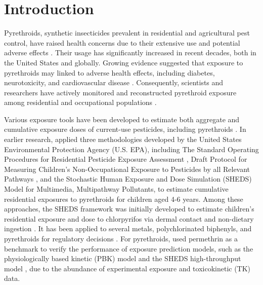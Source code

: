 \documentclass[toxics,article,submit,pdftex,moreauthors]{Definitions/mdpi}
\begin{document}
\section{Introduction}\label{introduction}

Pyrethroids, synthetic insecticides prevalent in residential and agricultural
pest control, have raised health concerns due to their extensive use and
potential adverse effects \citep{burns2018pyrethroid}. Their usage has
significantly increased in recent decades, both in the United States and
globally. Growing evidence suggested that exposure to pyrethroids may linked to
adverse health effects, including diabetes, neurotoxicity, and cardiovascular
disease \citep{park2019environmental, bao2020association,
kim2021environmental}. Consequently, scientists and researchers have actively
monitored and reconstructed pyrethroid exposure among residential and
occupational populations \citep{zartarian2012quantifying,
bravo2022occupational}.

Various exposure tools have been developed to estimate both aggregate
and cumulative exposure doses of current-use pesticides, including
pyrethroids
\citep{tulve2011methodologies, zartarian2012quantifying, xue2014epa}. In
earlier research, \citet{tulve2011methodologies} applied three methodologies
developed by the United States Environmental Protection Agency (U.S. EPA),
including The Standard Operating Procedures for Residential Pesticide Exposure
Assessment \citep{us2012standard}, Draft Protocol for Measuring Children's
Non-Occupational Exposure to Pesticides by all Relevant Pathways
\citep{us2001draft}, and the Stochastic Human Exposure and Dose Simulation
(SHEDS) Model for Multimedia, Multipathway Pollutants, to estimate cumulative
residential exposures to pyrethroids for children aged 4-6 years. Among these
approaches, the SHEDS framework was initially developed to estimate children's
residential exposure and dose to chlorpyrifos via dermal contact and
non-dietary ingestion \citep{zartarian2000modeling}. It has been applied to
several metals, polychlorinated biphenyls, and pyrethroids for regulatory
decisions \citep{tulve2011methodologies, xue2015modeling,
zartarian2017children}. For pyrethroids, \citet{zartarian2012quantifying} used
permethrin as a benchmark to verify the performance of exposure prediction
models, such as the physiologically based kinetic (PBK) model
\citep{tornero2012pharmacokinetic} and the SHEDS high-throughput model
\citep{isaacs2014sheds}, due to the abundance of experimental exposure and
toxicokinetic (TK) data.
\end{document}
